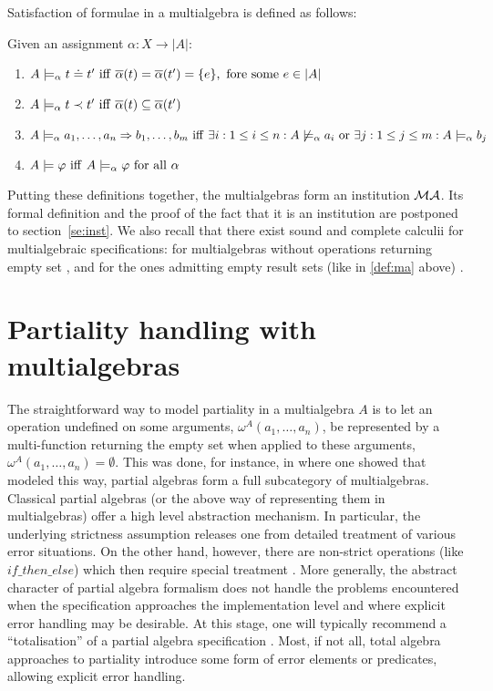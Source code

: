 \documentclass[10pt]{article}
\begin{document}
Satisfaction of formulae in a multialgebra is defined as follows:
\begin{definition}\label{de:sat}
Given an assignment $\alpha:X\to|A|$:
\begin{enumerate}
\item $A \models_\alpha t \mathrel{\dot{=} }  t'\ {\rm iff\ } \overline{\alpha}(t)
=\overline{\alpha}(t') = \{e\},\ {\rm fore\ some\ } e \in |A|$
\item $A \models_\alpha t \prec t'\ {\rm iff\ } \ovr{\alpha}(t) \subseteq \overline{\alpha}(t')$
\item $ A \models_\alpha a_1, \ldots ,a_n \Rightarrow b_1, \ldots ,b_m\ {\rm iff\ }
\exists i: 1 \leq i \leq n : A \not\models_\alpha a_i\ {\rm or\ } \exists j: 1 \leq j \leq m : A \models_\alpha b_j$
\item $A \models \varphi\ {\rm iff\ } A \models_\alpha \varphi\ {\rm for\ all\ } \alpha$
\end{enumerate}
\end{definition}
%
Putting these definitions together, the multialgebras form an institution
${\mathcal{MA}}$. Its formal definition and the proof of the fact that it is an
institution are postponed to  section~\ref{se:inst}.
We also recall that there exist sound and complete calculii for
multialgebraic specifications: for multialgebras without operations returning
empty set \cite{toplas,calc}, and for the ones admitting empty result sets
(like in \ref{def:ma} above) \cite{BK}.


\section{Partiality handling with multialgebras}
\label{se:part} %

The straightforward way to model partiality in a multialgebra $A$ is to let
an operation undefined on some arguments, $\omega^A(a_1, \ldots ,a_n)$, be
represented by a multi-function returning the empty set when applied to these
arguments, $\omega^A(a_1, \ldots ,a_n)=\emptyset$. This was done, for instance,
in
\cite{catrel} where one showed that modeled this way, partial algebras form a
full subcategory of multialgebras.  Classical partial algebras (or the above
way of representing them in multialgebras) offer a high level abstraction
mechanism. In particular, the underlying strictness assumption releases one
from detailed treatment of various error situations. On the other hand,
however, there are non-strict operations (like $if\_then\_else$) which then
require special treatment \cite{lazy,state}. 
More generally, the abstract
character of partial algebra formalism does not handle the problems
encountered when the specification approaches the implementation level and
where explicit error handling may be desirable. At this stage, one will
typically recommend a ``totalisation'' of a partial algebra specification \cite{state}.  Most, if not
all, total algebra approaches to partiality introduce some form of error
elements or predicates, allowing explicit error handling.
\end{document}
